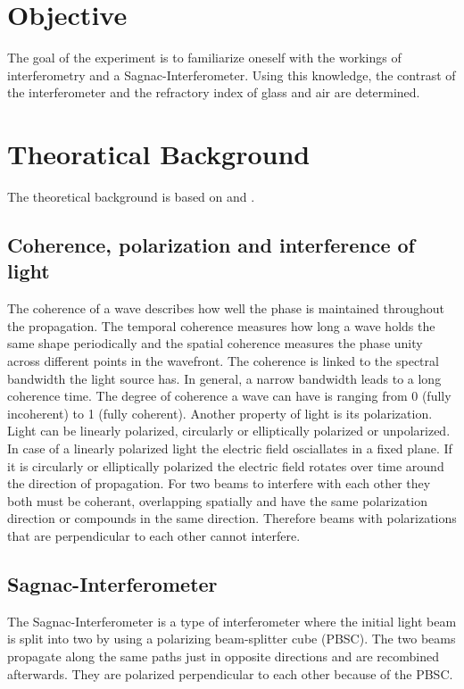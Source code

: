 \section{Objective}
\label{sec:Objective}
The goal of the experiment is to familiarize oneself with the workings of interferometry and a Sagnac-Interferometer. 
Using this knowledge, the contrast of the interferometer and the refractory index of glass and air are determined. 

\section{Theoratical Background}
\label{sec:Theorie}
The theoretical background is based on \cite{Optik} and \cite{anleitungV64}.
\subsection{Coherence, polarization and interference of light}
The coherence of a wave describes how well the phase is maintained throughout the propagation. The temporal coherence measures how long a 
wave holds the same shape periodically and the spatial coherence measures the phase unity across different points in the wavefront.
The coherence is linked to the spectral bandwidth the light source has. In general, a narrow bandwidth leads to a long coherence time.
The degree of coherence a wave can have is ranging from 0 (fully incoherent) to 1 (fully coherent). 
Another property of light is its polarization. Light can be linearly polarized, circularly or elliptically polarized or unpolarized. 
In case of a linearly polarized light the electric field osciallates in a fixed plane. If it is circularly or elliptically polarized the 
electric field rotates over time around the direction of propagation. 
For two beams to interfere with each other they both must be coherant, overlapping spatially and have the same polarization direction or
compounds in the same direction. Therefore beams with polarizations that are perpendicular to each other cannot interfere. 

\subsection{Sagnac-Interferometer}
\label{subsec:Sagnac_Interferometer}
The Sagnac-Interferometer is a type of interferometer where the initial light beam is split into two by using a polarizing beam-splitter 
cube (PBSC). The two beams propagate along the same paths just in opposite directions and are recombined afterwards. They are polarized 
perpendicular to each other because of the PBSC.

